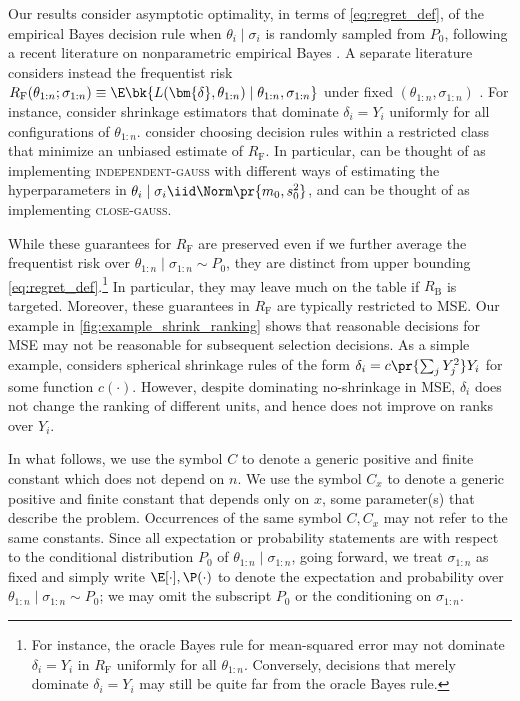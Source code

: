 \documentclass[12pt, reqno]{amsart}
\newcommand{\RF}{R_{\mathrm{F}}}
\newcommand{\RB}{R_{\mathrm{B}}}
\newcommand{\close}{\textsc{close}}
\newcommand{\closegauss}{\close-\textsc{gauss}}
\newcommand{\bdelta}{\bm{\delta}}
\newcommand{\indepgauss}{\textsc{independent-gauss}}
\numberwithin{equation}{section}
\begin{document}
\begin{rmksq}
\label{rmk:james-stein}
Our results consider asymptotic optimality, in terms of \eqref{eq:regret_def}, of the empirical Bayes
decision rule when $\theta_i \mid \sigma_i$ is randomly sampled from $P_0$, following a
recent literature on nonparametric empirical Bayes
\citep{jiang2020general,soloff2021multivariate}. A separate literature considers instead
the frequentist risk $\RF(\theta_{1:n}; \sigma_{1:n}) \equiv
\E\bk{
 L(\bdelta, \theta_{1:n}) \mid \theta_{1:n}, \sigma_{1:n} }$ under fixed $(\theta_{1:n},
 \sigma_{1:n})$ \citep{robbins1956}. For instance,
 \citet
  {james1992estimation,bock1975minimax,10.1214/07-AOAS138,weinstein2018group} consider
  shrinkage estimators that dominate $\delta_i = Y_i$ uniformly for all configurations of
  $\theta_{1:n}$. \citet{xie2012sure,kwon2021optimal} consider choosing decision rules
  within a restricted class that minimize an unbiased estimate of $\RF$. In
  particular, \citet{xie2012sure} can be thought of as implementing \indepgauss{} with
  different ways of estimating the hyperparameters in
  $\theta_i \mid\sigma_i \iid \Norm\pr{m_0, s_0^2}$, and \citet{weinstein2018group} can be
  thought of as implementing \closegauss.

 While these guarantees for $\RF$ are preserved even if we further average the frequentist
 risk over $\theta_{1:n} \mid
 \sigma_{1:n} \sim P_0$, they are distinct from upper bounding
 \eqref{eq:regret_def}.\footnote{For instance, the oracle Bayes rule for mean-squared error may not
  dominate $\delta_i = Y_i$ in $\RF$ uniformly for all $\theta_{1:n}$. Conversely,
  decisions that merely dominate $\delta_i = Y_i$ may still be quite far from the oracle
  Bayes rule.}  In particular, they may leave much on the table if $\RB$ is
  targeted. Moreover, these guarantees in $\RF$ are typically restricted to MSE. Our
  example in
 \cref{fig:example_shrink_ranking} shows that reasonable decisions for MSE may not be
  reasonable for subsequent selection decisions. As a simple example, \citet
  {bock1975minimax} considers spherical shrinkage rules of the form $\delta_{i} = c\pr
  {\sum_j Y_j^2} Y_i$ for some function $c(\cdot)$. However, despite dominating
  no-shrinkage in MSE, $\delta_i$ does not change the ranking of different units, and
  hence does not improve on ranks over $Y_i$.
\end{rmksq}

In what follows, we use the symbol $C$ to denote a generic positive and finite constant
which does not depend on $n$. We use the symbol $C_{x}$ to denote a generic positive and
finite constant that depends only on $x$, some parameter(s) that describe the problem.
Occurrences of the same symbol $C, C_x$ may not refer to the same constants. Since all
expectation or probability statements are with respect to the conditional distribution
$P_0$ of $\theta_{1:n} \mid \sigma_{1:n}$, going forward, we treat $\sigma_ {1:n}$ as
fixed and simply write $\E[\cdot], \P(\cdot)$ to denote the expectation and probability
over $\theta_{1:n} \mid \sigma_{1:n} \sim P_0$; we may omit the subscript $P_0$ or the
conditioning on $\sigma_{1:n}$.
\end{document}
